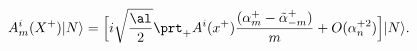 \begin{equation}
A^i_m(X^+)|N\rangle=\Big[i\sqrt{\frac{\al}{2}}\prt_+ A^i(x^+)
\frac{(\alpha^+_{m}-\tilde \alpha^+_{-m})}{m}
+ O(\alpha_n^{+2})\Big]|N\rangle.
\end{equation}

